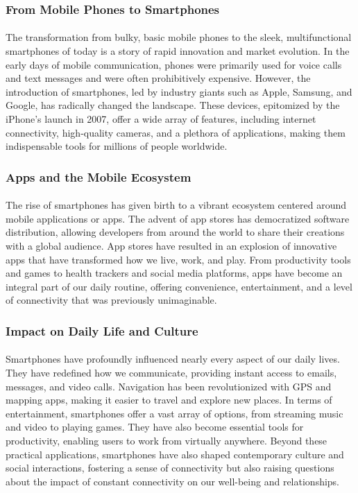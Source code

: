 \documentclass[a4paper,12pt]{book}
\begin{document}
\subsubsection*{From Mobile Phones to Smartphones}
\paragraph{}
The transformation from bulky, basic mobile phones to the sleek, multifunctional smartphones of today is a story of rapid innovation and market evolution. In the early days of mobile communication, phones were primarily used for voice calls and text messages and were often prohibitively expensive. However, the introduction of smartphones, led by industry giants such as Apple, Samsung, and Google, has radically changed the landscape. These devices, epitomized by the iPhone's launch in 2007, offer a wide array of features, including internet connectivity, high-quality cameras, and a plethora of applications, making them indispensable tools for millions of people worldwide.

\subsubsection*{Apps and the Mobile Ecosystem}
\paragraph{}
The rise of smartphones has given birth to a vibrant ecosystem centered around mobile applications or apps. The advent of app stores has democratized software distribution, allowing developers from around the world to share their creations with a global audience. App stores have resulted in an explosion of innovative apps that have transformed how we live, work, and play. From productivity tools and games to health trackers and social media platforms, apps have become an integral part of our daily routine, offering convenience, entertainment, and a level of connectivity that was previously unimaginable.

\subsubsection*{Impact on Daily Life and Culture}
\paragraph{}
Smartphones have profoundly influenced nearly every aspect of our daily lives. They have redefined how we communicate, providing instant access to emails, messages, and video calls. Navigation has been revolutionized with GPS and mapping apps, making it easier to travel and explore new places. In terms of entertainment, smartphones offer a vast array of options, from streaming music and video to playing games. They have also become essential tools for productivity, enabling users to work from virtually anywhere. Beyond these practical applications, smartphones have also shaped contemporary culture and social interactions, fostering a sense of connectivity but also raising questions about the impact of constant connectivity on our well-being and relationships.
\end{document}
